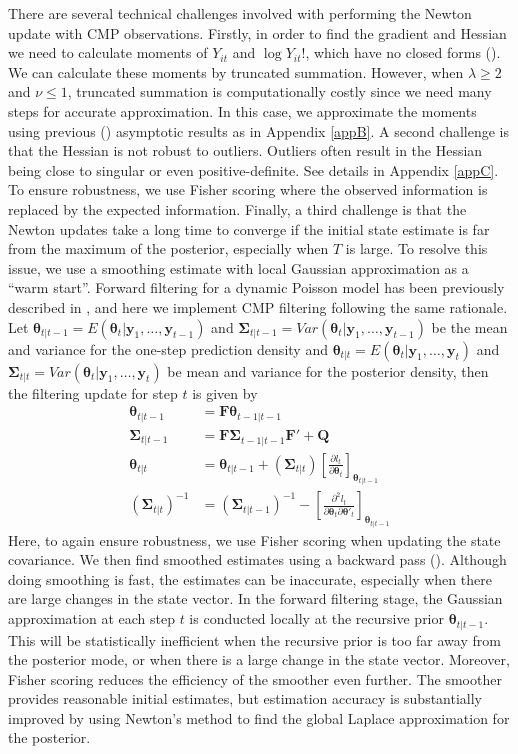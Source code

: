 \documentclass[]{article}
\begin{document}
	There are several technical challenges involved with performing the Newton update with CMP observations. Firstly, in order to find the gradient and Hessian we need to calculate moments of $Y_{it}$ and $\log Y_{it}!$, which have no closed forms (\cite{Shmueli2005}). We can calculate these moments by truncated summation. However, when $\lambda \geq 2$ and $\nu \leq 1$,  truncated summation is computationally costly since we need many steps for accurate approximation. In this case, we approximate the moments using previous (\cite{Chatla2018,Gaunt2019}) asymptotic results as in Appendix \ref{appB}. A second challenge is that the Hessian is not robust to outliers. Outliers often result in the Hessian being close to singular or even positive-definite. See details in Appendix \ref{appC}. To ensure robustness, we use Fisher scoring where the observed information is replaced by the expected information. Finally, a third challenge is that the Newton updates take a long time to converge if the initial state estimate is far from the maximum of the posterior, especially when $T$ is large. To resolve this issue, we use a smoothing estimate with local Gaussian approximation as a “warm start”. Forward filtering for a dynamic Poisson model has been previously described in \cite{Eden2004}, and here we implement CMP filtering following the same rationale. Let $\bm{\theta}_{t|t-1} = E(\bm{\theta}_t|\bm{y}_1,\ldots,\bm{y}_{t-1})$ and $\bm{\Sigma}_{t|t-1} = Var(\bm{\theta}_t|\bm{y}_1,\ldots,\bm{y}_{t-1})$ be the mean and variance for the one-step prediction density and $\bm{\theta}_{t|t} = E(\bm{\theta}_t|\bm{y}_1,\ldots,\bm{y}_{t})$ and $\bm{\Sigma}_{t|t} = Var(\bm{\theta}_t|\bm{y}_1,\ldots,\bm{y}_t)$ be mean and variance for the posterior density, then the filtering update for step $t$ is given by
	\begin{align}
		\bm{\theta}_{t|t-1} &= \bm{F\theta}_{t-1|t-1}\\
		\bm{\Sigma}_{t|t-1} &= \bm{F\Sigma}_{t-1|t-1}\bm{F}' + \bm{Q} \nonumber\\
		\bm{\theta}_{t|t} &= \bm{\theta}_{t|t-1} + (\bm{\Sigma}_{t|t})\left[\frac{\partial l_t}{\partial \bm{\theta}_t}\right]_{\bm{\theta}_{t|t-1}} \nonumber\\
		(\bm{\Sigma}_{t|t})^{-1} &= (\bm{\Sigma}_{t|t-1})^{-1} - \left[\frac{\partial^2l_t}{\partial\bm{\theta}_t\partial\bm{\theta}'_t}\right]_{\bm{\theta}_{t|t-1}} \nonumber
	\end{align}
	Here, to again ensure robustness, we use Fisher scoring when updating the state covariance. We then find smoothed estimates using a backward pass (\cite{RAUCH1965}). Although doing smoothing is fast, the estimates can be inaccurate, especially when there are large changes in the state vector. In the forward filtering stage, the Gaussian approximation at each step $t$ is conducted locally at the recursive prior $\bm{\theta}_{t|t-1}$. This will be statistically inefficient when the recursive prior is too far away from the posterior mode, or when there is a large change in the state vector. Moreover, Fisher scoring reduces the efficiency of the smoother even further. The smoother provides reasonable initial estimates, but estimation accuracy is substantially improved by using Newton’s method to find the global Laplace approximation for the posterior.
	
\end{document}
